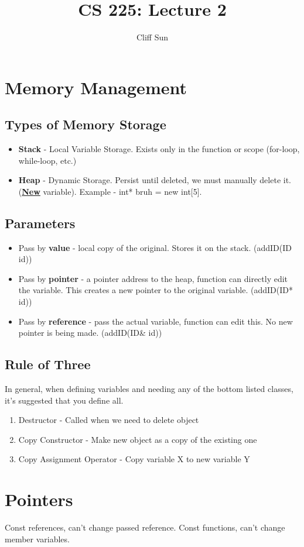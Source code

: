 \documentclass{article}
\title{CS 225: Lecture 2}
\author{Cliff Sun}
\newtheorem{one minute paper}[theorem]{One Minute Paper}
\begin{document}
\maketitle

\section*{Memory Management}

\subsection*{Types of Memory Storage}
\begin{itemize}
    \item \textbf{Stack} - Local Variable Storage. Exists only in the function or scope (for-loop, while-loop, etc.)
    \item \textbf{Heap} - Dynamic Storage. Persist until deleted, we must manually delete it. (\textbf{\underline{New}} variable). Example - int* bruh = new int[5]. 
\end{itemize}

\subsection*{Parameters}

\begin{itemize}
    \item Pass by \textbf{value} - local copy of the original. Stores it on the stack. (addID(ID id))
    \item Pass by \textbf{pointer} - a pointer address to the heap, function can directly edit the variable. This creates a new pointer to the original variable. (addID(ID* id))
    \item Pass by \textbf{reference} - pass the actual variable, function can edit this. No new pointer is being made. (addID(ID\& id))
\end{itemize}

\subsection*{Rule of Three}
In general, when defining variables and needing any of the bottom listed classes, it's suggested that you define all. 
\begin{enumerate}
    \item Destructor - Called when we need to delete object
    \item Copy Constructor - Make new object as a copy of the existing one
    \item Copy Assignment Operator - Copy variable X to new variable Y
\end{enumerate}

\section*{Pointers}

Const references, can't change passed reference. Const functions, can't change member variables. 
\end{document}
